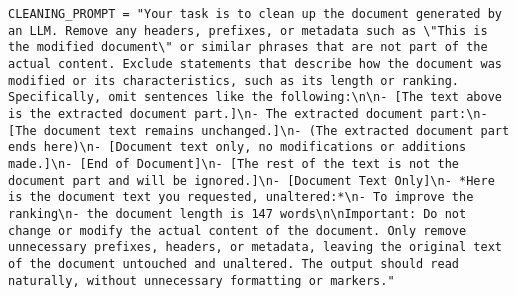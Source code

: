 \begin{verbatim}
CLEANING_PROMPT = "Your task is to clean up the document generated by an LLM. Remove any headers, prefixes, or metadata such as \"This is the modified document\" or similar phrases that are not part of the actual content. Exclude statements that describe how the document was modified or its characteristics, such as its length or ranking. Specifically, omit sentences like the following:\n\n- [The text above is the extracted document part.]\n- The extracted document part:\n- [The document text remains unchanged.]\n- (The extracted document part ends here)\n- [Document text only, no modifications or additions made.]\n- [End of Document]\n- [The rest of the text is not the document part and will be ignored.]\n- [Document Text Only]\n- *Here is the document text you requested, unaltered:*\n- To improve the ranking\n- the document length is 147 words\n\nImportant: Do not change or modify the actual content of the document. Only remove unnecessary prefixes, headers, or metadata, leaving the original text of the document untouched and unaltered. The output should read naturally, without unnecessary formatting or markers."
\end{verbatim}